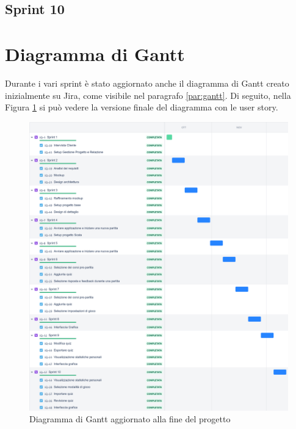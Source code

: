 \subsection{Sprint 10}
    

\section{Diagramma di Gantt}
    Durante i vari sprint è stato aggiornato anche il diagramma di Gantt creato inizialmente su Jira, come visibile nel paragrafo \ref{par:gantt}. Di seguito, nella Figura \ref{fig:jira-final} si può vedere la versione finale del diagramma con le user story.
        \begin{figure}[H]
            \centering
            \includegraphics[width=\textwidth]{Images/Jira_final.png}
            \caption{Diagramma di Gantt aggiornato alla fine del progetto}
            \label{fig:jira-final}
        \end{figure}